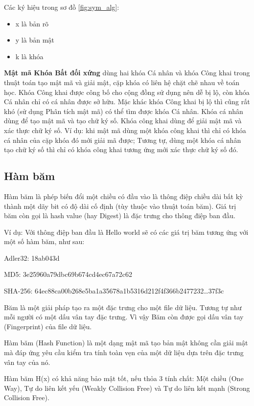 Các ký hiệu trong sơ đồ \ref{fig:sym_alg}:
\begin{itemize}
\item x là bản rõ
\item y là bản mật
\item k là khóa 
\end{itemize}

\textbf{Mật mã Khóa Bất đối xứng} dùng hai khóa Cá nhân và khóa Công khai trong thuật toán tạo mật mã và giải mật, cặp khóa có liên hệ chặt chẽ nhau về toán học. Khóa Công khai được công bố cho cộng đồng sử dụng nên dễ bị lộ, còn khóa Cá nhân chỉ có cá nhân được sở hữu. Mặc khác khóa Công khai bị lộ thì cũng rất khó (sử dụng Phân tích mật mã) có thể tìm được khóa Cá nhân.
Khóa cá nhân dùng để tạo mật mã và tạo chữ ký số. Khóa công khai dùng để giải mật mã và xác thực chữ ký số. Ví dụ: khi mật mã dùng một khóa công khai thì chỉ có khóa cá nhân của cặp khóa đó mới giải mã được; Tương tự, dùng một khóa cá nhân tạo chữ ký số thì chỉ có khóa công khai tương ứng mới xác thực chữ ký số đó.

\subsection{Hàm băm}

Hàm băm là phép biến đổi một chiều có đầu vào là thông điệp chiều dài bất kỳ thành một dãy bit có độ dài cố định (tùy thuộc vào thuật toán băm). Giá trị băm còn gọi là hash value (hay Digest) là đặc trưng cho thông điệp ban đầu.

Ví dụ: Với thông điệp ban đầu là Hello world sẽ có các giá trị băm tương ứng với một số hàm băm, như sau:

Adler32: 18ab043d

MD5: 3e25960a79dbc69b674cd4ec67a72c62

SHA-256: 64ec88ca00b268e5ba1a35678a1b5316d212f4f366b2477232\ldots 37f3c

Băm là một giải pháp tạo ra một đặc trưng cho một file dữ liệu. Tương tự như mỗi người có một dấu vân tay đặc trưng. Vì vậy Băm còn được gọi dấu vân tay (Fingerprint) của file dữ liệu.

Hàm băm (Hash Function) là một dạng mật mã tạo bản mật không cần giải mật mà đáp ứng yêu cầu kiểm tra tính toàn vẹn của một dữ liệu dựa trên đặc trưng vân tay của nó.

Hàm băm H(x) có khả năng bảo mật tốt, nếu thỏa 3 tính chất: 
Một chiều (One Way),  Tự do liên kết yếu (Weakly Collision Free) và Tự do liên kết mạnh (Strong Collision Free).


